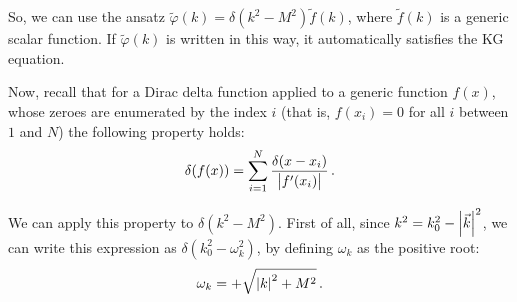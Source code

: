 \documentclass[main.tex]{subfiles}
\begin{document}
So, we can use the ansatz \(\widetilde{\varphi} (k)  = \delta (k^2 -M^2) \widetilde{f}(k)\), where \(\widetilde{f}(k)\) is a generic scalar function. 
If \(\widetilde{\varphi} (k)\) is written in this way, it automatically satisfies the KG equation. 

Now, recall that for a Dirac delta function applied to a generic function \(f(x)\), whose zeroes are enumerated by the index \(i\) (that is, \(f(x_{i}) = 0\) for all \(i\) between \(1\) and \(N\)) the following property holds: 
%
\begin{align}
\delta (f(x)) =  \sum _{i=1}^{N} \frac{ \delta (x - x_{i})}{\abs{f'(x_i)}}
\,.
\end{align}

We can apply this property to \(\delta (k^2-M^2)\).
First of all, since \(k^{2} = k_0^2 - \abs{\vec{k}}^2 \), we can write this expression as \(\delta (k_0^2 - \omega_{k}^2)\), by defining \(\omega_{k}\) as the positive root:
%
\begin{align}
\omega_{k} = + \sqrt{\abs{k}^2 + M^2}
\,.
\end{align}
\end{document}
